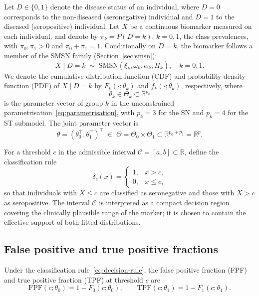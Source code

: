\documentclass[11pt,a4paper]{article}
\theoremstyle{definition}
\theoremstyle{remark}
\newcommand{\1}{\mathbf{1}}
\begin{document}
Let $D \in \{0,1\}$ denote the disease status of an individual,
where $D = 0$ corresponds to the non-diseased (seronegative)
individual and $D = 1$ to the diseased (seropositive) individual.
Let $X$ be a continuous biomarker measured on each individual,
and denote by $\pi_k = P(D = k)$, $k = 0, 1$, the class
prevalences, with $\pi_0, \pi_1 > 0$ and $\pi_0 + \pi_1 = 1$. Conditionally on $D = k$, the biomarker follows a member of
the SMSN family (Section~\ref{sec:smsn}):
\[
X \mid D = k \;\sim\; \mathrm{SMSN}(\xi_k, \omega_k, \alpha_k; H_k),
\quad k = 0, 1.
\]
We denote the cumulative distribution function (CDF) and
probability density function (PDF) of $X \mid D = k$ by
$F_k(\cdot;\theta_k)$ and $f_k(\cdot;\theta_k)$, respectively,
where
\[
\theta_k \in \Theta_k \subset \mathbb{R}^{p_k}
\]
is the parameter vector of group $k$ in the unconstrained
parametrisation~\eqref{eq:parametrisation},
with $p_k = 3$ for the SN and $p_k = 4$ for the ST submodel.
The joint parameter vector is
\[
\theta = (\theta_0^\top, \theta_1^\top)^\top
\;\in\;
\Theta = \Theta_0 \times \Theta_1 \subset \mathbb{R}^{p_0+p_1} = \mathbb{R}^{p}.
\]

For a threshold $c$ in the admissible interval
$\mathcal{C} = [a,b] \subset \mathbb{R}$, define the
classification rule
\begin{equation}
\label{eq:decision-rule}
\delta_c(x)
=
\begin{cases}
1, & x > c, \\
0, & x \leq c,
\end{cases}
\end{equation}
so that individuals with $X \leq c$ are classified as
seronegative and those with $X > c$ as seropositive.
The interval $\mathcal{C}$ is interpreted as a compact decision
region covering the clinically plausible range of the marker;
it is chosen to contain the effective support of both fitted
distributions.

\subsection{False positive and true positive fractions}
Under the classification rule~\eqref{eq:decision-rule},
the false positive fraction (FPF) and true positive fraction
(TPF) at threshold $c$ are
\begin{equation}
\label{eq:fpf-tpf}
\mathrm{FPF}(c;\theta_0)
= 1 - F_0(c;\theta_0),
\qquad
\mathrm{TPF}(c;\theta_1)
= 1 - F_1(c;\theta_1).
\end{equation}
\end{document}

